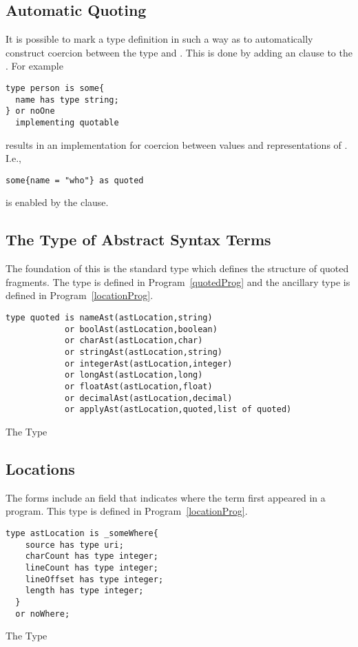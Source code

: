 \subsection{Automatic Quoting}
It is possible to mark a type definition in such a way as to automatically construct coercion between the type and . This is done by adding an  clause to the . For example
\begin{lstlisting}
type person is some{
  name has type string;
} or noOne 
  implementing quotable
\end{lstlisting}
results in an implementation for coercion between  values and  representations of . I.e., 
\begin{lstlisting}
some{name = "who"} as quoted
\end{lstlisting}
is enabled by the  clause.

\subsection{The Type of Abstract Syntax Terms}
The foundation of this is the standard  type which defines the structure of quoted fragments. The  type is defined in Program~\vref{quotedProg} and the ancillary type  is defined in Program~\vref{locationProg}.
\begin{program}
\begin{lstlisting}
type quoted is nameAst(astLocation,string)
            or boolAst(astLocation,boolean)
            or charAst(astLocation,char)
            or stringAst(astLocation,string)
            or integerAst(astLocation,integer)
            or longAst(astLocation,long)
            or floatAst(astLocation,float)
            or decimalAst(astLocation,decimal)
            or applyAst(astLocation,quoted,list of quoted)
\end{lstlisting}
\caption{The  Type\label{quotedProg}}
\end{program}

\subsection{Locations}
The  forms include an  field that indicates where the  term first appeared in a program. This type is defined in Program~\vref{locationProg}.
\begin{program}[htb]
\begin{lstlisting}
type astLocation is _someWhere{
    source has type uri;
    charCount has type integer;
    lineCount has type integer;
    lineOffset has type integer;
    length has type integer;
  }
  or noWhere;
\end{lstlisting}
\caption{The  Type\label{locationProg}}
\end{program}


